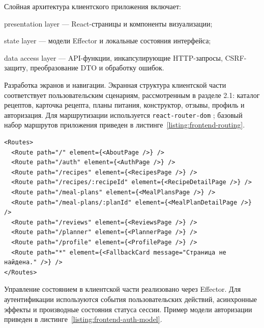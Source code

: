 Слойная архитектура клиентского приложения включает:
\begin{compactlist}
  \item presentation layer --- React-страницы и компоненты визуализации;
  \item state layer --- модели Effector и локальные состояния интерфейса;
  \item data access layer --- API-функции, инкапсулирующие HTTP-запросы, CSRF-защиту, преобразование DTO и обработку ошибок.
\end{compactlist}

Разработка экранов и навигации. Экранная структура клиентской части соответствует пользовательским сценариям, рассмотренным в разделе 2.1: каталог рецептов, карточка рецепта, планы питания, конструктор, отзывы, профиль и авторизация. Для маршрутизации используется \texttt{react-router-dom} \cite{react_router_docs_2026}; базовый набор маршрутов приложения приведен в листинге~\ref{listing:frontend-routing}.

\begin{listing}[H]
\caption{Маршрутизация экранов клиентской части}
\label{listing:frontend-routing}
\begin{mdframed}
\begin{verbatim}
<Routes>
  <Route path="/" element={<AboutPage />} />
  <Route path="/auth" element={<AuthPage />} />
  <Route path="/recipes" element={<RecipesPage />} />
  <Route path="/recipes/:recipeId" element={<RecipeDetailPage />} />
  <Route path="/meal-plans" element={<MealPlansPage />} />
  <Route path="/meal-plans/:planId" element={<MealPlanDetailPage />} />
  <Route path="/reviews" element={<ReviewsPage />} />
  <Route path="/planner" element={<PlannerPage />} />
  <Route path="/profile" element={<ProfilePage />} />
  <Route path="*" element={<FallbackCard message="Страница не найдена." />} />
</Routes>
\end{verbatim}
\end{mdframed}
\end{listing}

Управление состоянием в клиентской части реализовано через Effector. Для аутентификации используются события пользовательских действий, асинхронные эффекты и производные состояния статуса сессии. Пример модели авторизации приведен в листинге~\ref{listing:frontend-auth-model}.

